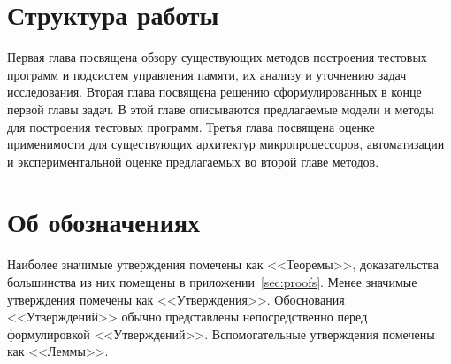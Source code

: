 \documentclass[14pt]{extreport}
\makeatletter
\renewcommand\appendix{\par
  \setcounter{chapter}{0}%
  \setcounter{section}{0}%
  \def\@chapapp{\appendixname}%
  \def\thechapter{\@Asbuk\c@chapter}}
\makeatother
\begin{document}
\section*{Структура работы}
Первая глава посвящена обзору существующих методов построения тестовых программ и подсистем управления памяти, их анализу и уточнению задач исследования. Вторая глава посвящена решению сформулированных в конце первой главы задач. В этой главе описываются предлагаемые модели и методы для построения тестовых программ. Третья глава посвящена оценке применимости для существующих архитектур микропроцессоров, автоматизации и экспериментальной оценке предлагаемых во второй главе методов.

\section*{Об обозначениях}

Наиболее значимые утверждения помечены как <<Теоремы>>, доказательства большинства из них помещены в приложении~\ref{sec:proofs}. Менее значимые утверждения помечены как <<Утверждения>>. Обоснования <<Утверждений>> обычно представлены непосредственно перед формулировкой <<Утверждений>>. Вспомогательные утверждения помечены как <<Леммы>>.











\pagebreak
\appendix
% 





\pagebreak




\end{document}
